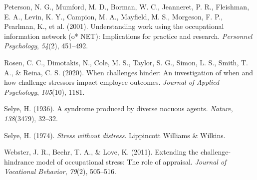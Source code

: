 \documentclass[
  jou]{apa6}
\newlength{\cslhangindent}
\newlength{\cslentryspacingunit} %
\newenvironment{CSLReferences}[2] %
 {%
  \setlength{\parindent}{0pt}
  \ifodd #1
  \let\oldpar\par
  \def\par{\hangindent=\cslhangindent\oldpar}
  \fi
  \setlength{\parskip}{#2\cslentryspacingunit}
 }%
 {}
\begin{document}
\begin{CSLReferences}{1}{0}
\leavevmode{}%
Peterson, N. G., Mumford, M. D., Borman, W. C., Jeanneret, P. R., Fleishman, E. A., Levin, K. Y., Campion, M. A., Mayfield, M. S., Morgeson, F. P., Pearlman, K., et al. (2001). Understanding work using the occupational information network (o* NET): Implications for practice and research. \emph{Personnel Psychology}, \emph{54}(2), 451--492.

\leavevmode{}%
Rosen, C. C., Dimotakis, N., Cole, M. S., Taylor, S. G., Simon, L. S., Smith, T. A., \& Reina, C. S. (2020). When challenges hinder: An investigation of when and how challenge stressors impact employee outcomes. \emph{Journal of Applied Psychology}, \emph{105}(10), 1181.

\leavevmode{}%
Selye, H. (1936). A syndrome produced by diverse nocuous agents. \emph{Nature}, \emph{138}(3479), 32--32.

\leavevmode{}%
Selye, H. (1974). \emph{Stress without distress}. Lippincott Williams \& Wilkins.

\leavevmode{}%
Webster, J. R., Beehr, T. A., \& Love, K. (2011). Extending the challenge-hindrance model of occupational stress: The role of appraisal. \emph{Journal of Vocational Behavior}, \emph{79}(2), 505--516.

\end{CSLReferences}
\end{document}
